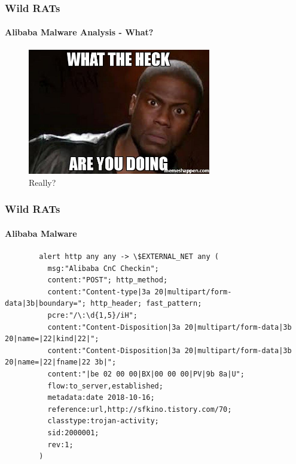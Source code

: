 \documentclass[aspectratio=169]{beamer}
\begin{document}
\begin{frame}
  \frametitle{Wild RATs}
  \framesubtitle{Alibaba Malware Analysis - What?}
  \begin{center}
    \begin{figure}
      \includegraphics[width=8cm,keepaspectratio]{what_are_you_doing}
      \caption{Really?}
    \end{figure}
  \end{center}
\end{frame}

\begin{frame}[fragile]{}
  \frametitle{Wild RATs}
  \framesubtitle{Alibaba Malware}
  \begin{center}
    \begin{tcolorbox}[title=alibaba.rules,colback=black]
    \begin{minipage}{0.5\textwidth}
      \begin{verbatim}
        alert http any any -> \$EXTERNAL_NET any (
          msg:"Alibaba CnC Checkin";
          content:"POST"; http_method;
          content:"Content-type|3a 20|multipart/form-data|3b|boundary="; http_header; fast_pattern;
          pcre:"/\:\d{1,5}/iH";
          content:"Content-Disposition|3a 20|multipart/form-data|3b 20|name=|22|kind|22|";
          content:"Content-Disposition|3a 20|multipart/form-data|3b 20|name=|22|fname|22 3b|";
          content:"|be 02 00 00|BX|00 00 00|PV|9b 8a|U";
          flow:to_server,established;
          metadata:date 2018-10-16;
          reference:url,http://sfkino.tistory.com/70;
          classtype:trojan-activity;
          sid:2000001;
          rev:1;
        )
      \end{verbatim}
    \end{minipage}
    \end{tcolorbox}
  \end{center}
\end{frame}
\end{document}
